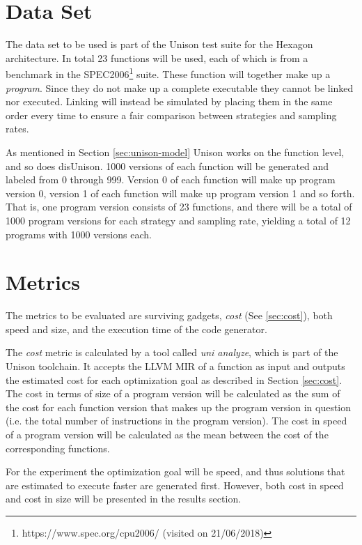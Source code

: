 \section{Data Set}

The data set to be used is part of the Unison test suite for the Hexagon architecture. In
total 23 functions will be used, each of which is from a benchmark in the SPEC2006\footnote{https://www.spec.org/cpu2006/ (visited on 21/06/2018)}
suite. These function will together make up a \textit{program}. Since they do not make up
a complete executable they cannot be linked nor executed. Linking will instead be simulated
by placing them in the same order every time to ensure a fair comparison between
strategies and sampling rates.

As mentioned in Section \ref{sec:unison-model} Unison works on the function level, and so
does disUnison. 1000 versions of each function will be generated and labeled from 0 through
999. Version 0 of each function will make up program version 0, version 1 of each function
will make up program version 1 and so forth. That is, one program version consists of 23
functions, and there will be a total of 1000 program versions for each strategy and
sampling rate, yielding a total of 12 programs with 1000 versions each.

\section{Metrics}
\label{sec:metrics}

The metrics to be evaluated are surviving gadgets, \textit{cost} (See \ref{sec:cost}),
both speed and size, and the execution time of the code generator.

The \textit{cost} metric is calculated by a tool called \textit{uni analyze}, which is
part of the Unison toolchain. It accepts the LLVM MIR of a function as input and outputs
the estimated cost for each optimization goal as described in Section \ref{sec:cost}. The
cost in terms of size of a program version will be calculated as the sum of the cost for
each function version that makes up the program version in question (i.e. the total number
of instructions in the program version). The cost in speed of a program version will be
calculated as the  mean between the cost of the corresponding functions.

For the experiment the optimization goal will be speed, and thus solutions that are
estimated to execute faster are generated first. However, both cost in speed and cost in
size will be presented in the results section.

